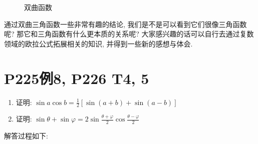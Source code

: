 \documentclass{book}
\begin{document}
    \begin{figure}[htbp]    %
          \centering            %
          \caption{双曲函数}    %
          \label{fig:subfig_1}            %
        \end{figure}

        通过双曲三角函数一些非常有趣的结论, 我们是不是可以看到它们很像三角函数呢? 那它和三角函数有什么更本质的关系呢? 大家感兴趣的话可以自行去通过复数领域的欧拉公式拓展相关的知识, 并得到一些新的感想与体会.
    \section{\textcolor[rgb]{0.11,0.65,0.52}{P225例8, P226 T4, 5}}
    \begin{boxB}
        \begin{enumerate}
            \item 证明: $\displaystyle \sin a\cos b=\frac{1}{2}[\sin(a+b)+\sin(a-b)]$
            \item 证明: $\displaystyle \sin \theta + \sin \varphi = 2\sin\frac{\theta+\varphi}{2}\cos\frac{\theta-\varphi}{2}$
        \end{enumerate}
    \end{boxB}
    解答过程如下:
\end{document}
